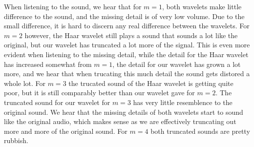 \documentclass[a4paper, 11pt, notitlepage, english]{article}
\begin{document}
When listening to the sound, we hear that for $m=1$, both wavelets make little difference to the sound, and the missing detail is of very low volume. Due to the small difference, it is hard to discern any real difference between the wavelets. For $m=2$ however, the Haar wavelet still plays a sound that sounds a lot like the original, but our wavelet has truncated a lot more of the signal. This is even more evident when listening to the missing detail, while the detail for the Haar wavelet has increased somewhat from $m=1$, the detail for our wavelet has grown a lot more, and we hear that when trucating this much detail the sound gets distored a whole lot. For $m=3$ the trucated sound of the Haar wavelet is getting quite poor, but it is still comparably better than our wavelet gave for $m=2$. The truncated sound for our wavelet for $m=3$ has very little resemblence to the original sound. We hear that the missing details of both wavelets start to sound like the original audio, which makes sense as we are effectively truncating out more and more of the original sound. For $m=4$ both truncated sounds are pretty rubbish.
\end{document}
